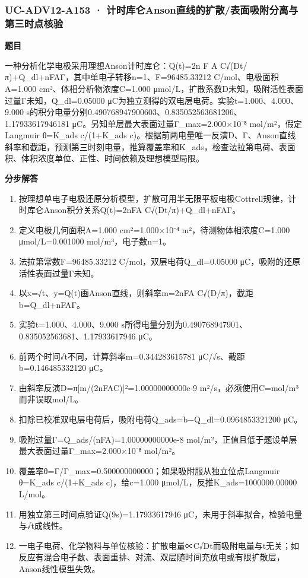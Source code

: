 \documentclass[UTF8,11pt,a4paper]{ctexart}
\begin{document}
\subsubsection*{UC-ADV12-A153 · 计时库仑Anson直线的扩散/表面吸附分离与第三时点核验}
\noindent\textbf{题目}\par
一种分析化学电极采用理想Anson计时库仑：Q(t)=2n F A C√(Dt/π)+Q\_dl+nFAΓ，其中单电子转移n=1、F=96485.33212 C/mol、电极面积A=1.000 cm²、体相分析物浓度C=1.000 μmol/L，扩散系数D未知，吸附活性表面过量Γ未知，Q\_dl=0.05000 μC为独立测得的双电层电荷。实验t=1.000、4.000、9.000 s的积分电量分别0.490768947900603、0.835052563681206、1.17933617946181 μC。另知单层最大表面过量Γ\_max=2.000×10⁻⁸ mol/m²，假定Langmuir θ=K\_ads c/(1+K\_ads c)。根据前两电量唯一反演D、Γ、Anson直线斜率和截距，预测第三时刻电量，推算覆盖率和K\_ads，检查法拉第电荷、表面积、体积浓度单位、正性、时间依赖及理想模型局限。\par
\medskip\noindent\textbf{分步解答}
\begin{enumerate}
\item 按理想单电子电极还原分析模型，扩散可用半无限平板电极Cottrell规律，计时库仑Anson积分关系Q(t)=2nFA C√(Dt/π)+Q\_dl+nFAΓ。
\item 定义电极几何面积A=1.000 cm²=1.000×10⁻⁴ m²，待测物体相浓度C=1.000 μmol/L=0.001000 mol/m³，电子数n=1。
\item 法拉第常数F=96485.33212 C/mol，双层电荷Q\_dl=0.05000 μC，吸附的还原活性表面过量Γ未知。
\item 以x=√t、y=Q(t)画Anson直线，则斜率m=2nFA C√(D/π)，截距b=Q\_dl+nFAΓ。
\item 实验t=1.000、4.000、9.000 s所得电量分别为0.490768947901、0.835052563681、1.17933617946 μC。
\item 前两个时间√t不同，计算斜率m=0.344283615781 μC/√s、截距b=0.146485332120 μC。
\item 由斜率反演D=π[m/(2nFAC)]²=1.00000000000e-9 m²/s，必须使用C=mol/m³而非误取mol/L。
\item 扣除已校准双电层电荷后，吸附电荷Q\_ads=b−Q\_dl=0.0964853321200 μC。
\item 吸附过量Γ=Q\_ads/(nFA)=1.00000000000e-8 mol/m²，正值且低于题设单层最大表面过量Γ\_max=2.000×10⁻⁸ mol/m²。
\item 覆盖率θ=Γ/Γ\_max=0.500000000000；如果吸附服从独立位点Langmuir θ=K\_ads c/(1+K\_ads c)，给c=1.000 μmol/L，反推K\_ads=1000000.00000 L/mol。
\item 用独立第三时间点验证Q(9s)=1.17933617946 μC，未用于斜率拟合，检验电量与√t成线性。
\item 一电子电荷、化学物料与单位核验：扩散电量∝C√Dt而吸附电量与t无关；如反应有混合电子数、表面重排、对流、双层随时间充放电或有限扩散层，Anson线性模型失效。
\end{enumerate}
\end{document}
